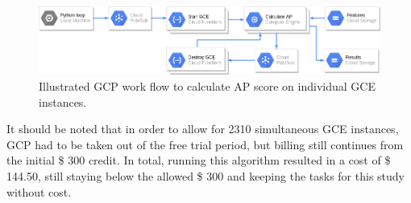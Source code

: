 \begin{figure}[h]
    \centering
    \includegraphics[width=0.9\linewidth]{content/fig/workflow.png}
    \caption{Illustrated GCP work flow to calculate AP score on individual GCE instances.}
    \label{fig:workflow}
\end{figure}

It should be noted that in order to allow for 2310 simultaneous GCE instances, GCP had to be taken out of the free trial period, but billing still continues from the initial \$ 300 credit.
In total, running this algorithm resulted in a cost of \$ 144.50, still staying below the allowed \$ 300 and keeping the tasks for this study without cost.